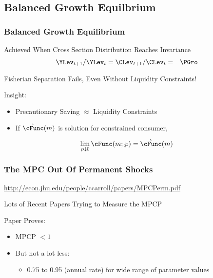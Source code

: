 \documentclass[pdflatex]{beamer}\providecommand{\texname}{BufferStockTheorySlides}%
\begin{document}
\subsection{Balanced Growth Equilbrium}
\begin{frame}
\frametitle{Balanced Growth Equilibrium}

Achieved When Cross Section Distribution Reaches Invariance
\begin{eqnarray}
  \YLev_{t+1}/\YLev_{t} = \CLev_{t+1}/\CLev_{t} & = & \PGro
\end{eqnarray}

Fisherian Separation Fails, Even Without Liquidity Constraints!
\medskip\medskip

\pause Insight:
\begin{itemize}
\item  Precautionary Saving $\approx$ Liquidity Constraints
\item If $\grave{\cFunc}(m)$ is solution for constrained consumer, 
\end{itemize}
\pause
\begin{equation}
\lim_{ \wp \downarrow 0} \cFunc(m;\wp) = \grave{\cFunc}(m)
\end{equation}


\end{frame}

\begin{frame}
\frametitle{The MPC Out Of Permanent Shocks}

\url{http://econ.jhu.edu/people/ccarroll/papers/MPCPerm.pdf}
\medskip

Lots of Recent Papers Trying to Measure the MPCP

\medskip
Paper Proves:

\begin{itemize}
\item MPCP $< 1$
\item But not a lot less:
\begin{itemize}
\item 0.75 to 0.95 (annual rate) for wide range of parameter values
\end{itemize}
\end{itemize}

\end{frame}
\end{document}
